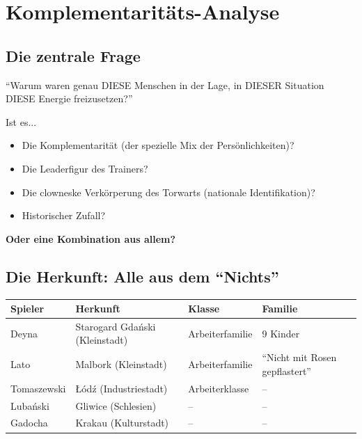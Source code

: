 \documentclass[11pt,a4paper]{book}
\newenvironment{thesenbox}{%
  \begin{mdframed}[
    linecolor=polishred,
    linewidth=2pt,
    backgroundcolor=polishred!5,
    innertopmargin=15pt,
    innerbottommargin=15pt
  ]
  \centering\large\itshape
}{%
  \end{mdframed}
}
\begin{document}

\chapter{Komplementaritäts-Analyse}

\section{Die zentrale Frage}

\begin{thesenbox}
``Warum waren genau DIESE Menschen in der Lage, in DIESER Situation DIESE Energie freizusetzen?''
\end{thesenbox}

Ist es...
\begin{itemize}
    \item Die Komplementarität (der spezielle Mix der Persönlichkeiten)?
    \item Die Leaderfigur des Trainers?
    \item Die clowneske Verkörperung des Torwarts (nationale Identifikation)?
    \item Historischer Zufall?
\end{itemize}

\textbf{Oder eine Kombination aus allem?}

\section{Die Herkunft: Alle aus dem ``Nichts''}

\begin{longtable}{L{2.5cm}L{4cm}L{3cm}L{3.5cm}}
\toprule
\textbf{Spieler} & \textbf{Herkunft} & \textbf{Klasse} & \textbf{Familie} \\
\midrule
\endhead
Deyna & Starogard Gdański (Kleinstadt) & Arbeiterfamilie & 9 Kinder \\
Lato & Malbork (Kleinstadt) & Arbeiterfamilie & ``Nicht mit Rosen gepflastert'' \\
Tomaszewski & Łódź (Industriestadt) & Arbeiterklasse & -- \\
Lubański & Gliwice (Schlesien) & -- & -- \\
Gadocha & Krakau (Kulturstadt) & -- & -- \\
\bottomrule
\end{longtable}
\end{document}
